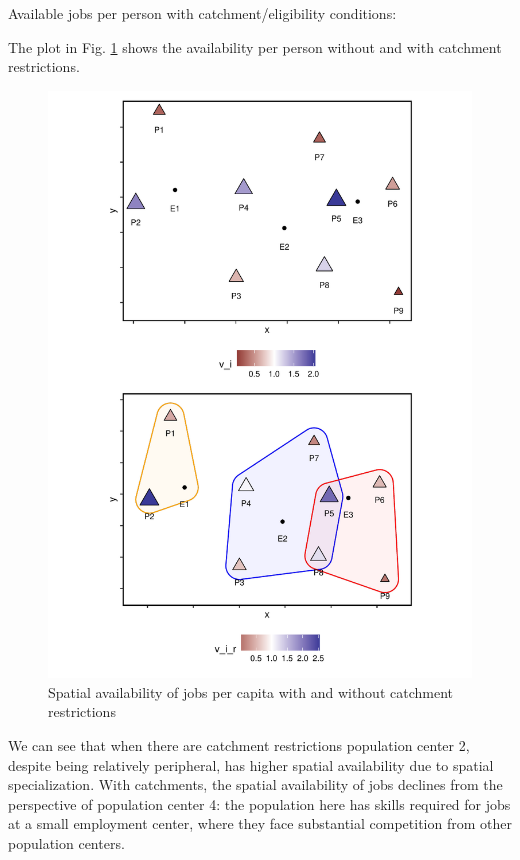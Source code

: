 \documentclass[]{elsarticle} %
\begin{document}
Available jobs per person with catchment/eligibility conditions:

The plot in Fig.
\ref{fig:toy-example-availability-with-catchments-per-capita} shows the
availability per person without and with catchment restrictions.

\begin{figure}
\includegraphics[width=1\linewidth]{Spatial-Availability_files/figure-latex/toy-example-availability-with-catchments-per-capita-1} \caption{\label{fig:toy-example-availability-with-catchments-per-capita}Spatial availability of jobs per capita with and without catchment restrictions }\label{fig:toy-example-availability-with-catchments-per-capita}
\end{figure}

We can see that when there are catchment restrictions population center
2, despite being relatively peripheral, has higher spatial availability
due to spatial specialization. With catchments, the spatial availability
of jobs declines from the perspective of population center 4: the
population here has skills required for jobs at a small employment
center, where they face substantial competition from other population
centers.
\end{document}

